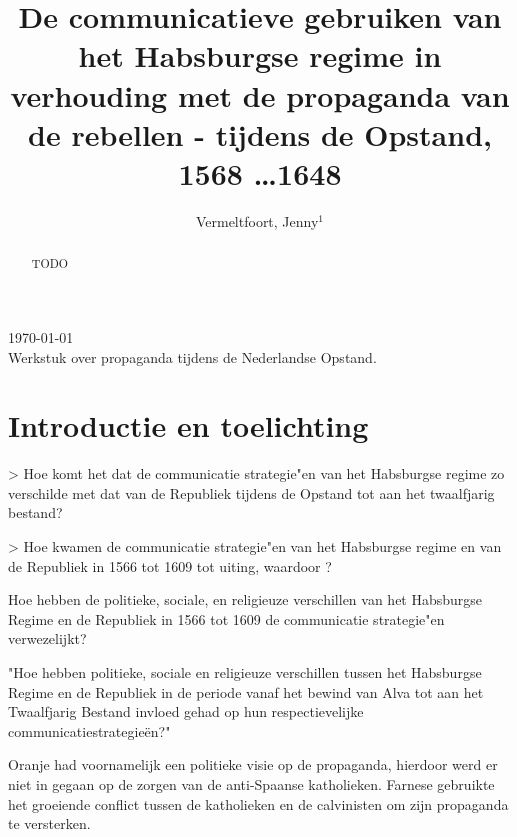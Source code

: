 \documentclass[11pt]{amsart}
\begin{document}
\setcounter{page}{1}

\hfill     {\small \today} \\
{\small Werkstuk over propaganda tijdens de Nederlandse Opstand.}\hfill
{\small } %

\centerline{}

\centerline{}

\title[Propaganda tijdens de Opstand]{De communicatieve gebruiken van het Habsburgse regime in
     verhouding met de propaganda van de rebellen - tijdens de Opstand,
     1568 \ldots 1648}

\author[J. Vermeltfoort]{Vermeltfoort, Jenny$^1$}

\address{$^{1}$ 3787494, Faculteit Geesteswetenschappen, Leiden
     Universiteit, Leiden, Nederland.}
\email{\textcolor[rgb]{0.00,0.00,0.84}{j.vermeltfoort@umail.leidenuniv.nl}}

\begin{abstract}
     TODO
\end{abstract}
\maketitle

\section{Introductie en toelichting}

> Hoe komt het dat de communicatie strategie"en van het Habsburgse regime zo verschilde met dat van de Republiek tijdens de Opstand tot aan het twaalfjarig bestand?

> Hoe kwamen de communicatie strategie"en van het Habsburgse regime en van de Republiek in 1566 tot 1609 tot uiting, waardoor ?

Hoe hebben de politieke, sociale, en religieuze verschillen van het Habsburgse Regime en de Republiek in 1566 tot 1609
de communicatie strategie"en verwezelijkt?

"Hoe hebben politieke, sociale en religieuze verschillen tussen het Habsburgse Regime en de Republiek in de periode vanaf het bewind van Alva tot aan het Twaalfjarig Bestand invloed gehad op hun respectievelijke communicatiestrategieën?"

Oranje had voornamelijk een politieke visie op de propaganda, hierdoor werd er niet in gegaan op de zorgen van de
anti-Spaanse katholieken. Farnese gebruikte het groeiende conflict tussen de katholieken en de calvinisten om zijn
propaganda te versterken.
\end{document}
